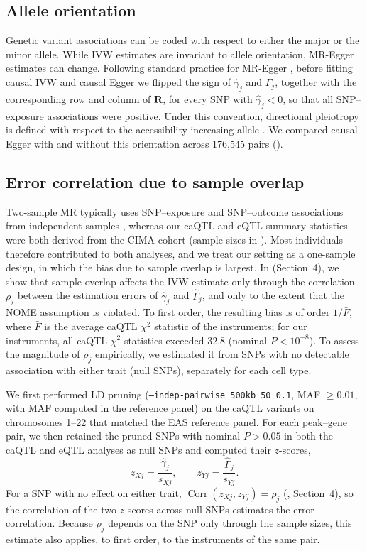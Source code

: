 \subsection{Allele orientation}
\label{sec:orientation}
Genetic variant associations can be coded with respect to either the major or the minor allele. While IVW estimates are invariant to allele orientation, MR-Egger estimates can change. Following standard practice for MR-Egger \cite{bowden2015egger,burgess2017interpreting}, before fitting causal IVW and causal Egger we flipped the sign of $\hat{\gamma}_j$ and $\hat{\Gamma}_j$, together with the corresponding row and column of $\boldsymbol R$, for every SNP with $\hat{\gamma}_j<0$, so that all SNP--exposure associations were positive. Under this convention, directional pleiotropy is defined with respect to the accessibility-increasing allele \cite{bowden2015egger,burgess2017interpreting}. We compared causal Egger with and without this orientation across 176,545 pairs ().


\subsection{Error correlation due to sample overlap}
\label{sec:overlap}
Two-sample MR typically uses SNP--exposure and SNP--outcome associations from independent samples \cite{burgess2016overlap}, whereas our caQTL and eQTL summary statistics were both derived from the CIMA cohort (sample sizes in ). Most individuals therefore contributed to both analyses, and we treat our setting as a one-sample design, in which the bias due to sample overlap is largest. In  (Section~4), we show that sample overlap affects the IVW estimate only through the correlation $\rho_j$ between the estimation errors of $\hat{\gamma}_j$ and $\hat{\Gamma}_j$, and only to the extent that the NOME assumption is violated. To first order, the resulting bias is of order $1/\bar{F}$, where $\bar{F}$ is the average caQTL $\chi^2$ statistic of the instruments; for our instruments, all caQTL $\chi^2$ statistics exceeded 32.8 (nominal $P<10^{-8}$). To assess the magnitude of $\rho_j$ empirically, we estimated it from SNPs with no detectable association with either trait (null SNPs), separately for each cell type.

\noindent We first performed LD pruning (\texttt{--indep-pairwise 500kb 50 0.1}, MAF $\geq 0.01$, with MAF computed in the reference panel) on the caQTL variants on chromosomes 1--22 that matched the EAS reference panel. For each peak--gene pair, we then retained the pruned SNPs with nominal $P>0.05$ in both the caQTL and eQTL analyses as null SNPs and computed their $z$-scores,
\begin{equation*}
z_{Xj} = \frac{\hat{\gamma}_j}{s_{Xj}}, \qquad z_{Yj} = \frac{\hat{\Gamma}_j}{s_{Yj}}.
\end{equation*}
For a SNP with no effect on either trait, $\operatorname{Corr}(z_{Xj},z_{Yj})=\rho_j$ (, Section~4), so the correlation of the two $z$-scores across null SNPs estimates the error correlation. Because $\rho_j$ depends on the SNP only through the sample sizes, this estimate also applies, to first order, to the instruments of the same pair.

